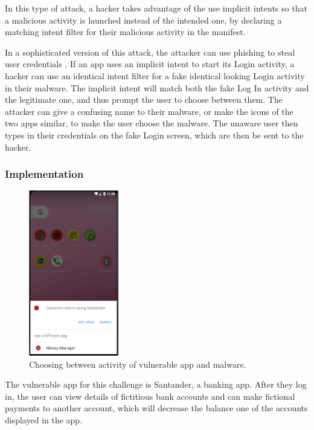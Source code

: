     In this type of attack, a hacker takes advantage of the use implicit intents so that a malicious activity is launched instead of the intended one, by declaring a matching intent filter for their malicious activity in the manifest.
    
    In a sophisticated version of this attack, the attacker can use phishing to steal user credentials \cite{2010_icc_paper}. If an app uses an implicit intent to start its Login activity, a hacker can use an identical intent filter for a fake identical looking Login activity in their malware. The implicit intent will match both the fake Log In activity and the legitimate one, and thus prompt the user to choose between them. The attacker can give a confusing name to their malware, or make the icons of the two apps similar, to make the user choose the malware. The unaware user then types in their credentials on the fake Login screen, which are then be sent to the hacker.
    
    \subsubsection{Implementation}
        \label{subsubsec:activity_hijack_implementation}
        
    \begin{figure}
        \centering
        \includegraphics[width=0.35\textwidth]{graphics/activity_hijack.PNG}
        \caption{Choosing between activity of vulnerable app and malware.}
        \label{fig:activity_hijack}
    \end{figure}
        
    The vulnerable app for this challenge is Santander, a banking app. After they log in, the user can view details of fictitious bank accounts and can make fictional payments to another account, which will decrease the balance one of the accounts displayed in the app.
    
